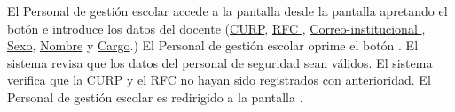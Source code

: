 \begin{UCtrayectoria}

    \UCpaso[\UCactor] El Personal de gestión escolar accede a la pantalla \label{CU37.introduceDatos} desde la pantalla  apretando el botón  e introduce los datos del docente (\hyperlink{Docente.CURP }{CURP}, \hyperlink{Docente.RFC }{RFC }, \hyperlink{Docente.Correo-institucional}{ Correo-institucional }, \hyperlink{Docente.Sexo}{Sexo}, \hyperlink{ Docente.Nombre}{Nombre} y \hyperlink{Docente.Cargo}{Cargo}.)
    \UCpaso[\UCactor] El Personal de gestión escolar oprime el botón .
    \UCpaso El sistema revisa que los datos del personal de seguridad sean válidos.
    \UCpaso El sistema verifica que la CURP y el RFC no hayan sido registrados con anterioridad.
    \UCpaso[\UCactor] El Personal de gestión escolar es redirigido a la pantalla .

\end{UCtrayectoria}

